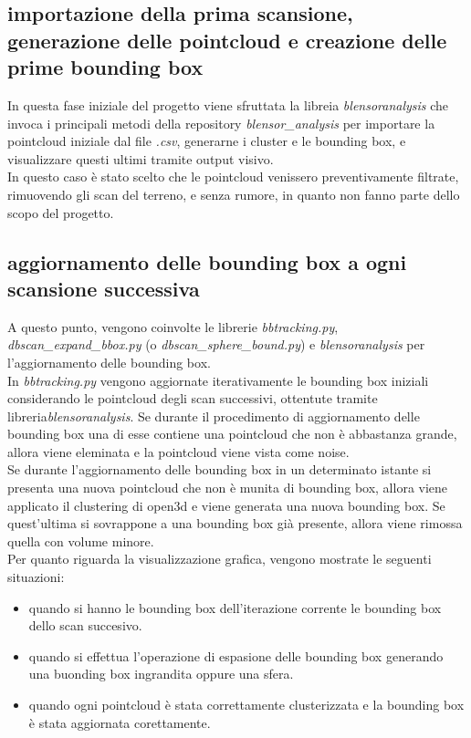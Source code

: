 \documentclass[italian]{article}
\begin{document}
\subsection{importazione della prima scansione, generazione delle pointcloud e creazione delle prime bounding box}
In questa fase iniziale del progetto viene sfruttata la libreia \textit{blensoranalysis} che invoca i principali metodi della repository \textit{blensor\_analysis} per importare la pointcloud iniziale dal file \textit{.csv}, generarne i cluster e le bounding box, e visualizzare questi ultimi tramite output visivo.\\
In questo caso è stato scelto che le pointcloud venissero preventivamente filtrate, rimuovendo gli scan del terreno, e senza rumore, in quanto non fanno parte dello scopo del progetto.\\
\subsection{aggiornamento delle bounding box a ogni scansione successiva}
A questo punto, vengono coinvolte le librerie \textit{bbtracking.py}, \textit{dbscan\_expand\_bbox.py} (o \textit{dbscan\_sphere\_bound.py}) e \textit{blensoranalysis} per l'aggiornamento delle bounding box.\\
In \textit{bbtracking.py} vengono aggiornate iterativamente le bounding box iniziali considerando le pointcloud degli scan successivi, ottentute tramite libreria\textit{blensoranalysis}. Se durante il procedimento di aggiornamento delle bounding box una di esse contiene una pointcloud che non è abbastanza grande, allora viene eleminata e la pointcloud viene vista come noise.\\
Se durante l'aggiornamento delle bounding box in un determinato istante si presenta una nuova pointcloud che non è munita di bounding box, allora viene applicato il clustering di open3d e viene generata una nuova bounding box. Se quest'ultima si sovrappone a una bounding box già presente, allora viene rimossa quella con volume minore.\\
Per quanto riguarda la visualizzazione grafica, vengono mostrate le seguenti situazioni:
\begin{itemize}
	\item quando si hanno le bounding box dell'iterazione corrente le bounding box dello scan succesivo.
	\item quando si effettua l'operazione di espasione delle bounding box generando una buonding box ingrandita oppure una sfera.
	\item quando ogni pointcloud è stata correttamente clusterizzata e la bounding box è stata aggiornata corettamente.
\end{itemize}
\end{document}
